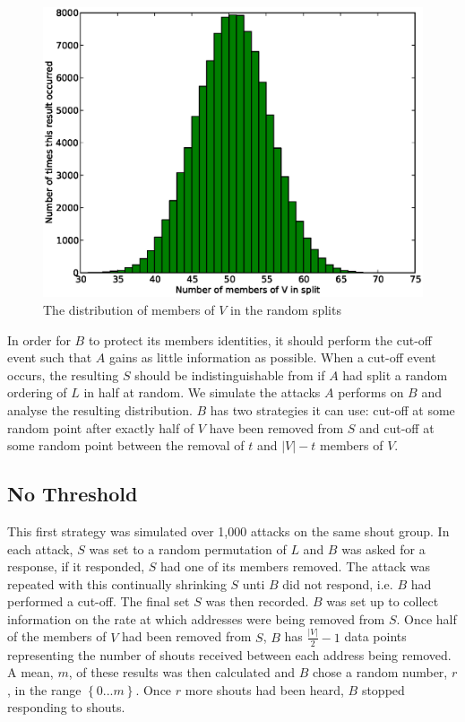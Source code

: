 \documentclass[ %
                    author={Luke Murray},
                supervisor={Dr. Simon Hollis},
                     title={Shadow Peer-to-Peer Networks},
                  subtitle={},
                    degree={MEng},
                      year={2013} ]{thesis}
\begin{document}
\begin{figure}[h]
    \centering
    \begin{minipage}[b]{0.6\linewidth}
        \centering
        \includegraphics[width=\linewidth]{diagrams/split_result.eps}
        \caption{The distribution of members of $V$ in the random splits}
    \end{minipage}
    \label{random_split_result}
\end{figure}

In order for $B$ to protect its members identities, it should perform the cut-off event such that $A$ gains as little information as possible. When a cut-off event occurs, the resulting $S$ should be indistinguishable from if $A$ had split a random ordering of $L$ in half at random. We simulate the attacks $A$ performs on $B$ and analyse the resulting distribution. $B$ has two strategies it can use: cut-off at some random point after exactly half of $V$ have been removed from $S$ and cut-off at some random point between the removal of $t$ and $|V| - t$ members of $V$.

\subsection{No Threshold}

This first strategy was simulated over 1,000 attacks on the same shout group. In each attack, $S$ was set to a random permutation of $L$ and $B$ was asked for a response, if it responded, $S$ had one of its members removed. The attack was repeated with this continually shrinking $S$ unti $B$ did not respond, i.e. $B$ had performed a cut-off. The final set $S$ was then recorded. $B$ was set up to collect information on the rate at which addresses were being removed from $S$. Once half of the members of $V$ had been removed from $S$, $B$ has $\frac{|V|}{2} - 1$ data points representing the number of shouts received between each address being removed. A mean, $m$, of these results was then calculated and $B$ chose a random number, $r$, in the range $\left\{0 ... m\right\}$. Once $r$ more shouts had been heard, $B$ stopped responding to shouts. 
\end{document}
